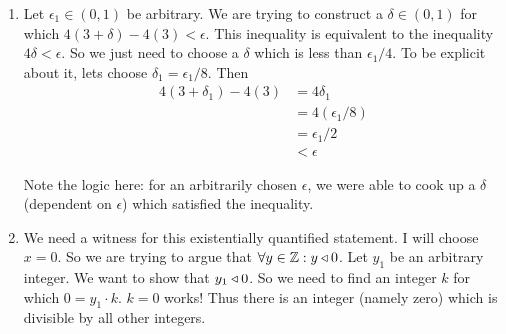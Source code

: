\begin{solutions}
\begin{enumerate}
		\item Let $\epsilon_1 \in (0,1)$ be arbitrary.  We are trying to construct a $\delta \in (0,1)$ for which $4(3+\delta)-4(3) < \epsilon$.  This inequality is equivalent to the inequality $4\delta < \epsilon$.  So we just need to choose a $\delta$ which is less than $\epsilon_1/4$.  To be explicit about it, lets choose $\delta_1 = \epsilon_1/8$.  Then 
		\begin{align*}
			4(3+\delta_1)-4(3) &= 4\delta_1 \\
			&= 4(\epsilon_1/8)\\
			&=\epsilon_1/2\\
			&<\epsilon
		\end{align*}
		
		Note the logic here:  for an arbitrarily chosen $\epsilon$, we were able to cook up a $\delta$ (dependent on $\epsilon$) which satisfied the inequality.
		\item We need a witness for this existentially quantified statement.  I will choose $x=0$.  So we are trying to argue that $\forall y \in \mathbb{Z}:  y \triangleleft 0$.  Let $y_1$ be an arbitrary integer.  We want to show that $y_1 \triangleleft 0$.  So we need to find an integer $k$ for which $0 = y_1 \cdot k$.  $k=0$ works!  Thus there is an integer (namely zero) which is divisible by all other integers.
	\end{enumerate}
\end{solutions}




